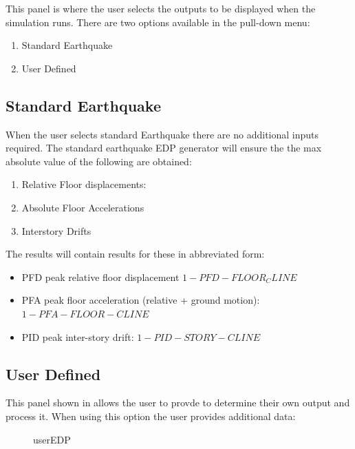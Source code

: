 This panel is where the user selects the outputs to be displayed when
the simulation runs. There are two options available in the pull-down
menu:
\begin{enumerate}
\item Standard Earthquake
\item User Defined
\end{enumerate}

\subsection{Standard Earthquake}
When the user selects standard Earthquake there are no additional
inputs required. The standard earthquake EDP generator will ensure the
the max absolute value of the following are obtained:
\begin{enumerate}
\item Relative Floor displacements:
\item Absolute Floor Accelerations
\item Interstory Drifts
\end{enumerate}

The results will contain results for these in abbreviated form:
\begin{itemize}
\item PFD peak relative floor displacement $1-PFD-FLOOR_CLINE$
\item PFA peak floor acceleration (relative + ground motion):
  $1-PFA-FLOOR-CLINE$
\item PID peak inter-story drift: $1-PID-STORY-CLINE$
\end{itemize}

\subsection{User Defined}
This panel shown in  allows the user to provde to determine their own output and process it. When using this option the user provides additional data:

\begin{figure}[!htbp]
  \caption{userEDP}
  \label{fig:userEDP}
\end{figure}


